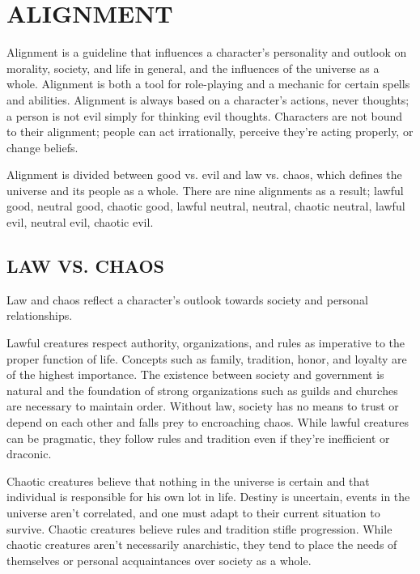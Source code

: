 \chapter{ALIGNMENT}

\begin{multicols}{2}

Alignment is a guideline that influences a character's personality and outlook on morality, society, and life in general, and the influences of the universe as a whole.  Alignment is both a tool for role-playing and a mechanic for certain spells and abilities.  Alignment is always based on a character's actions, never thoughts; a person is not evil simply for thinking evil thoughts.  Characters are not bound to their alignment; people can act irrationally, perceive they're acting properly, or change beliefs.

Alignment is divided between good vs. evil and law vs. chaos, which defines the universe and its people as a whole.  There are nine alignments as a result; lawful good, neutral good, chaotic good, lawful neutral, neutral, chaotic neutral, lawful evil, neutral evil, chaotic evil.

\section{LAW VS. CHAOS}

Law and chaos reflect a character's outlook towards society and personal relationships.

Lawful creatures respect authority, organizations, and rules as imperative to the proper function of life.  Concepts such as family, tradition, honor, and loyalty are of the highest importance.  The existence between society and government is natural and the foundation of strong organizations such as guilds and churches are necessary to maintain order.  Without law, society has no means to trust or depend on each other and falls prey to encroaching chaos.  While lawful creatures can be pragmatic, they follow rules and tradition even if they're inefficient or draconic.

Chaotic creatures believe that nothing in the universe is certain and that individual is responsible for his own lot in life.  Destiny is uncertain, events in the universe aren't correlated, and one must adapt to their current situation to survive.  Chaotic creatures believe rules and tradition stifle progression.  While chaotic creatures aren't necessarily anarchistic, they tend to place the needs of themselves or personal acquaintances over society as a whole.


\end{multicols}
